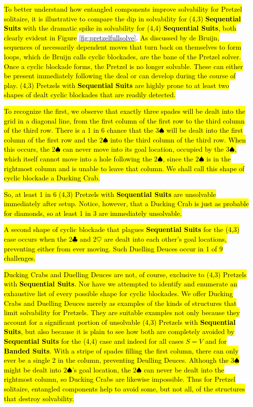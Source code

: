 \documentclass[journal]{IEEEtran}
\begin{document}
\hl{To better understand how entangled components improve solvability for Pretzel solitaire, it is illustrative to compare the dip in solvability for (4,3) \textbf{Sequential Suits} with the dramatic spike in solvability for (4,4) \textbf{Sequential Suits}, both clearly evident in Figure} \ref{fig:pretzelfullsolve}. \hl{As discussed by de Bruijn, sequences of necessarily dependent moves that turn back on themselves to form loops, which de Bruijn calls cyclic blockades, are the bane of the Pretzel solver. Once a cyclic blockade forms, the Pretzel is no longer solvable. These can either be present immediately following the deal or can develop during the course of play. (4,3) Pretzels with \textbf{Sequential Suits} are highly prone to at least two shapes of dealt cyclic blockades that are readily detected.}

\hl{To recognize the first, we observe that exactly three spades will be dealt into the grid in a diagonal line, from the first column of the first row to the third column of the third row. There is a 1 in 6 chance that the $3\spadesuit$ will be dealt into the first column of the first row and the $2\spadesuit$ into the third column of the third row. When this occurs, the $2\spadesuit$ can never move into its goal location, occupied by the $3\spadesuit$, which itself cannot move into a hole following the $2\spadesuit$, since the $2\spadesuit$ is in the rightmost column and is unable to leave that column. We shall call this shape of cyclic blockade a Ducking Crab.}

\hl{So, at least 1 in 6 (4,3) Pretzels with \textbf{Sequential Suits} are unsolvable immediately after setup. Notice, however, that a Ducking Crab is just as probable for diamonds, so at least 1 in 3 are immediately unsolvable.}

\hl{A second shape of cyclic blockade that plagues \textbf{Sequential Suits} for the (4,3) case occurs when the $2\clubsuit$ and $2\heartsuit$ are dealt into each other's goal locations, preventing either from ever moving. Such Duelling Deuces occur in 1 of 9 challenges.}

\hl{Ducking Crabs and Duelling Deuces are not, of course, exclusive to (4,3) Pretzels with \textbf{Sequential Suits}. Nor have we attempted to identify and enumerate an exhaustive list of every possible shape for cyclic blockades. We offer Ducking Crabs and Duelling Deuces merely as examples of the kinds of structures that limit solvability for Pretzels. They are suitable examples not only because they account for a significant portion of unsolvable (4,3) Pretzels with \textbf{Sequential Suits}, but also because it is plain to see how both are completely avoided by \textbf{Sequential Suits} for the (4,4) case and indeed for all cases $S = V$ and for \textbf{Banded Suits}. With a stripe of spades filling the first column, there can only ever be a single 2 in the column, preventing Deulling Deuces. Although the $3\spadesuit$ might be dealt into $2\spadesuit$'s goal location, the $2\spadesuit$ can never be dealt into the rightmost column, so Ducking Crabs are likewise impossible. Thus for Pretzel solitaire, entangled components help to avoid some, but not all, of the structures that destroy solvability.}
\end{document}
